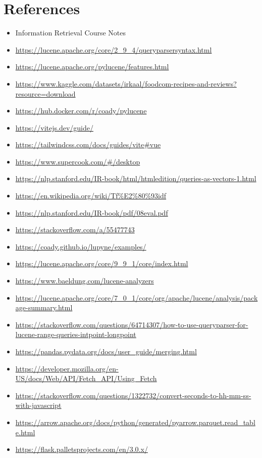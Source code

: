 \documentclass{article}
\begin{document}
\section{References}
\begin{itemize}
    \item Information Retrieval Course Notes
    \item \url{https://lucene.apache.org/core/2_9_4/queryparsersyntax.html}
    \item \url{https://lucene.apache.org/pylucene/features.html}
    \item \url{https://www.kaggle.com/datasets/irkaal/foodcom-recipes-and-reviews?resource=download}
    \item \url{https://hub.docker.com/r/coady/pylucene}
    \item \url{https://vitejs.dev/guide/}
    \item \url{https://tailwindcss.com/docs/guides/vite#vue}
    \item \url{https://www.supercook.com/#/desktop}
    \item \url{https://nlp.stanford.edu/IR-book/html/htmledition/queries-as-vectors-1.html}
    \item \url{https://en.wikipedia.org/wiki/Tf%E2%80%93idf}
    \item \url{https://nlp.stanford.edu/IR-book/pdf/08eval.pdf}
    \item \url{https://stackoverflow.com/a/55477743}
    \item \url{https://coady.github.io/lupyne/examples/}
    \item \url{https://lucene.apache.org/core/9_9_1/core/index.html}
    \item \url{https://www.baeldung.com/lucene-analyzers}
    \item \url{https://lucene.apache.org/core/7_0_1/core/org/apache/lucene/analysis/package-summary.html}
    \item \url{https://stackoverflow.com/questions/64714307/how-to-use-queryparser-for-lucene-range-queries-intpoint-longpoint}
    \item \url{https://pandas.pydata.org/docs/user_guide/merging.html}
    \item \url{https://developer.mozilla.org/en-US/docs/Web/API/Fetch_API/Using_Fetch}
    \item \url{https://stackoverflow.com/questions/1322732/convert-seconds-to-hh-mm-ss-with-javascript}
    \item \url{https://arrow.apache.org/docs/python/generated/pyarrow.parquet.read_table.html}
    \item \url{https://flask.palletsprojects.com/en/3.0.x/}
\end{itemize}
\end{document}
